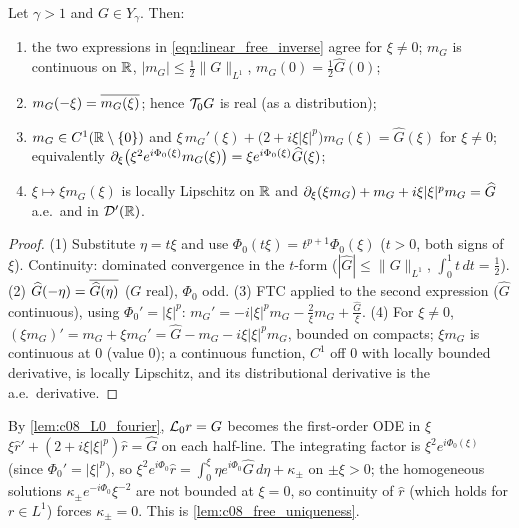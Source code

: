 \begin{lemma}
  \label{lem:c08_free_ode}
  Let $\gamma>1$ and $G\in Y_\gamma$. Then:
  \begin{enumerate}
    \item the two expressions in \eqref{eqn:linear_free_inverse} agree for $\xi\neq0$; $m_G$ is continuous on $\mathbb{R}$,
      $|m_G|\le\frac12\|G\|_{L^1}$, $m_G(0)=\frac12\widehat G(0)$;
    \item $m_G(-\xi)=\overline{m_G(\xi)}$; hence $\mathcal{T}_0G$ is real (as a distribution);
    \item $m_G\in C^1(\mathbb{R}\setminus\{0\})$ and $\xi\,m_G'(\xi)+\bigl(2+i\xi|\xi|^p\bigr)m_G(\xi)=\widehat G(\xi)$ for $\xi\neq0$;
      equivalently $\partial_\xi\bigl(\xi^2e^{i\Phi_0(\xi)}m_G(\xi)\bigr)=\xi e^{i\Phi_0(\xi)}\widehat G(\xi)$;
    \item $\xi\mapsto\xi m_G(\xi)$ is locally Lipschitz on $\mathbb{R}$ and
      $\partial_\xi(\xi m_G)+m_G+i\xi|\xi|^pm_G=\widehat G$ a.e.\ and in $\mathcal D'(\mathbb{R})$.
  \end{enumerate}
\end{lemma}
\begin{proof}
  (1) Substitute $\eta=t\xi$ and use $\Phi_0(t\xi)=t^{p+1}\Phi_0(\xi)$ ($t>0$, both signs of $\xi$). Continuity: dominated
  convergence in the $t$-form ($|\widehat G|\le\|G\|_{L^1}$, $\int_0^1t\,dt=\frac12$). (2) $\widehat G(-\eta)=\overline{\widehat G(\eta)}$ ($G$ real),
  $\Phi_0$ odd. (3) FTC applied to the second expression ($\widehat G$ continuous), using $\Phi_0'=|\xi|^p$:
  $m_G'=-i|\xi|^pm_G-\frac2\xi m_G+\frac{\widehat G}{\xi}$. (4) For $\xi\ne0$, $(\xi m_G)'=m_G+\xi m_G'=\widehat G-m_G-i\xi|\xi|^pm_G$,
  bounded on compacts; $\xi m_G$ is continuous at $0$ (value $0$); a continuous function, $C^1$ off $0$ with locally
  bounded derivative, is locally Lipschitz, and its distributional derivative is the a.e.\ derivative.
\end{proof}

\begin{remark}
  By \cref{lem:c08_L0_fourier}, $\mathcal{L}_0r=G$ becomes the first-order ODE in $\xi$
  $\xi\widehat r'+(2+i\xi|\xi|^p)\widehat r=\widehat G$ on each half-line. The integrating factor is $\xi^2e^{i\Phi_0(\xi)}$ (since
  $\Phi_0'=|\xi|^p$), so $\xi^2e^{i\Phi_0}\widehat r=\int_0^\xi\eta e^{i\Phi_0}\widehat G\,d\eta+\kappa_\pm$ on $\pm\xi>0$; the
  homogeneous solutions $\kappa_\pm e^{-i\Phi_0}\xi^{-2}$ are not bounded at $\xi=0$, so continuity of $\widehat r$ (which holds for
  $r\in L^1$) forces $\kappa_\pm=0$. This is \cref{lem:c08_free_uniqueness}.
\end{remark}

